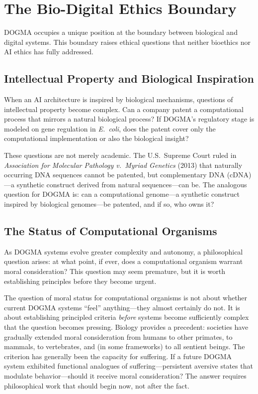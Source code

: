\section{The Bio-Digital Ethics Boundary}
\label{sec:bio-digital-ethics}

DOGMA occupies a unique position at the boundary between biological and digital systems.
This boundary raises ethical questions that neither bioethics nor AI ethics has fully addressed.

\subsection{Intellectual Property and Biological Inspiration}

When an AI architecture is inspired by biological mechanisms, questions of intellectual property become complex.
Can a company patent a computational process that mirrors a natural biological process?
If DOGMA's regulatory stage is modeled on gene regulation in \textit{E.\ coli}, does the patent cover only the computational implementation or also the biological insight?

These questions are not merely academic.
The U.S.\ Supreme Court ruled in \emph{Association for Molecular Pathology v.\ Myriad Genetics} (2013) that naturally occurring DNA sequences cannot be patented, but complementary DNA (cDNA)---a synthetic construct derived from natural sequences---can be.
The analogous question for DOGMA is: can a computational genome---a synthetic construct inspired by biological genomes---be patented, and if so, who owns it?

\subsection{The Status of Computational Organisms}

As DOGMA systems evolve greater complexity and autonomy, a philosophical question arises: at what point, if ever, does a computational organism warrant moral consideration?
This question may seem premature, but it is worth establishing principles before they become urgent.

\begin{keyinsight}
The question of moral status for computational organisms is not about whether current DOGMA systems ``feel'' anything---they almost certainly do not.
It is about establishing principled criteria \emph{before} systems become sufficiently complex that the question becomes pressing.
Biology provides a precedent: societies have gradually extended moral consideration from humans to other primates, to mammals, to vertebrates, and (in some frameworks) to all sentient beings.
The criterion has generally been the capacity for suffering.
If a future DOGMA system exhibited functional analogues of suffering---persistent aversive states that modulate behavior---should it receive moral consideration?
The answer requires philosophical work that should begin now, not after the fact.
\end{keyinsight}


